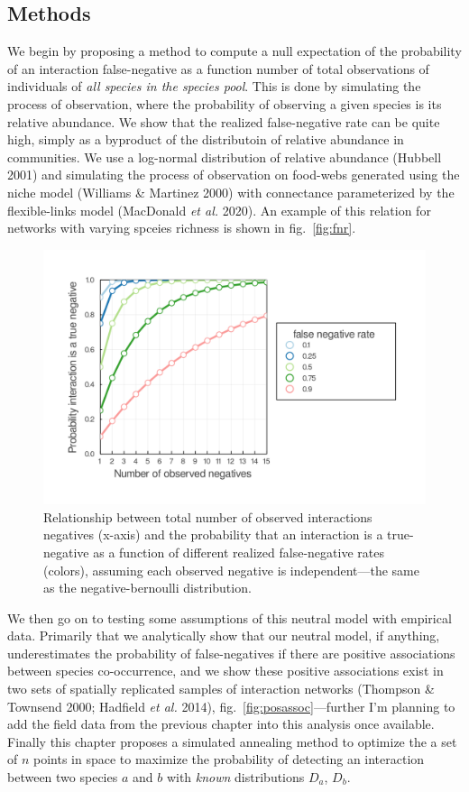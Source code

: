 \documentclass[10pt,oneside]{article}
\makeatletter
\def\maxwidth{\ifdim\Gin@nat@width>\linewidth\linewidth
\else\Gin@nat@width\fi}
\let\Oldincludegraphics\includegraphics
\renewcommand{\includegraphics}[1]{\Oldincludegraphics[width=\maxwidth]{#1}}
\makeatother
\begin{document}
\hypertarget{methods}{%
\subsection{Methods}\label{methods}}

We begin by proposing a method to compute a null expectation of the
probability of an interaction false-negative as a function number of
total observations of individuals of \emph{all species in the species
pool}. This is done by simulating the process of observation, where the
probability of observing a given species is its relative abundance. We
show that the realized false-negative rate can be quite high, simply as
a byproduct of the distributoin of relative abundance in communities. We
use a log-normal distribution of relative abundance (Hubbell 2001) and
simulating the process of observation on food-webs generated using the
niche model (Williams \& Martinez 2000) with connectance parameterized
by the flexible-links model (MacDonald \emph{et al.} 2020). An example
of this relation for networks with varying spceies richness is shown in
fig.~\ref{fig:fnr}.

\begin{figure}
\centering
\includegraphics{./figures/negativebinomial.png}
\caption{Relationship between total number of observed interactions
negatives (x-axis) and the probability that an interaction is a
true-negative as a function of different realized false-negative rates
(colors), assuming each observed negative is independent---the same as
the negative-bernoulli distribution.}
\end{figure}

We then go on to testing some assumptions of this neutral model with
empirical data. Primarily that we analytically show that our neutral
model, if anything, underestimates the probability of false-negatives if
there are positive associations between species co-occurrence, and we
show these positive associations exist in two sets of spatially
replicated samples of interaction networks (Thompson \& Townsend 2000;
Hadfield \emph{et al.} 2014), fig.~\ref{fig:posassoc}---further I'm
planning to add the field data from the previous chapter into this
analysis once available. Finally this chapter proposes a simulated
annealing method to optimize the a set of \(n\) points in space to
maximize the probability of detecting an interaction between two species
\(a\) and \(b\) with \emph{known} distributions \(D_a\), \(D_b\).
\end{document}
